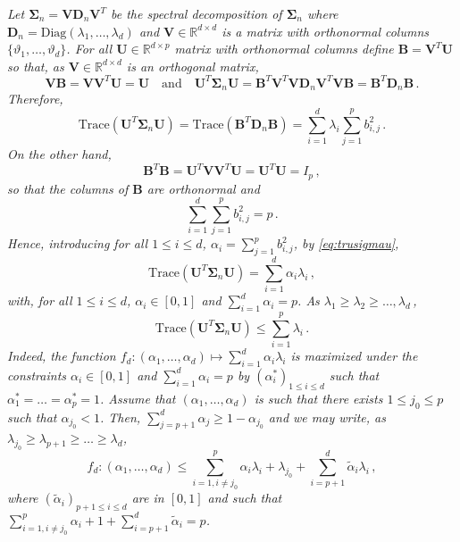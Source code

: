 \documentclass[a4paper,10pt,fleqn]{article}
\newcommand{\eqsp}{\,}
\newcommand{\rset}{\ensuremath{\mathbb{R}}}
\newcommand{\1}{\ensuremath{\mathbbm{1}}}
\newcommand{\bfU}{\mathbf{U}}
\newcommand{\bfs}{\mathbf{\Sigma}}
\newcommand{\bfV}{\mathbf{V}}
\newcommand{\bfB}{\mathbf{B}}
\newcommand{\bfD}{\mathbf{D}}
\begin{document}
\begin{enumerate}
{\em
 Let $\bfs_n = \bfV\bfD_n\bfV^T$ be the spectral decomposition of $\bfs_n$ where $\bfD_n = \mathrm{Diag}(\lambda_1,\ldots,\lambda_d)$ and $\bfV\in\rset^{d\times d}$  is a matrix with orthonormal columns $\{\vartheta_1,\ldots,\vartheta_d\}$. For all  $\bfU\in\rset^{d\times p}$ matrix with orthonormal columns define $\bfB = \bfV^T\bfU$ so that, as $\bfV\in\rset^{d\times d}$ is an orthogonal matrix,
$$
\bfV\bfB = \bfV\bfV^T\bfU = \bfU\quad\mathrm{and}\quad \bfU^T\bfs_n \bfU = \bfB^T\bfV^T\bfV\bfD_n\bfV^T\bfV\bfB = \bfB^T\bfD_n\bfB\eqsp.
$$
Therefore,
\begin{equation}
\label{eq:trusigmau}
\mathrm{Trace}(\bfU^T\bfs_n \bfU) = \mathrm{Trace}(\bfB^T\bfD_n\bfB) = \sum_{i = 1}^d \lambda_i \sum_{j=1}^p b^2_{i,j}\eqsp.
\end{equation}
On the other hand,
$$
\bfB^T\bfB = \bfU^T\bfV\bfV^T\bfU = \bfU^T\bfU = I_p\eqsp,
$$
so that the columns of $\bfB$ are orthonormal and
$$
\sum_{i = 1}^d \sum_{j=1}^p b^2_{i,j} = p\eqsp.
$$
Hence, introducing for all $1\leqslant i \leqslant d$, $\alpha_i =  \sum_{j=1}^p b^2_{i,j}$, by \eqref{eq:trusigmau},
$$
\mathrm{Trace}(\bfU^T\bfs_n \bfU) = \sum_{i=1}^{d}\alpha_i\lambda_i\eqsp,
$$
with, for all $1\leqslant i\leqslant d$, $\alpha_i \in[0,1]$ and $\sum_{i=1}^d\alpha_i  = p$. As $\lambda_1 \geqslant \lambda_2\geqslant \ldots, \lambda_d$\eqsp,
$$
\mathrm{Trace}(\bfU^T\bfs_n \bfU) \leqslant \sum_{i=1}^{p}\lambda_i\eqsp.
$$
Indeed, the function $f_d:(\alpha_1,\ldots,\alpha_d)\mapsto\sum_{i=1}^{d}\alpha_i\lambda_i$ is maximized under the constraints   $\alpha_i \in[0,1]$ and $\sum_{i=1}^d\alpha_i  = p$ by $(\alpha^*_i)_{1\leqslant i \leqslant d}$ such that $\alpha^*_1=\ldots=\alpha^*_p=1$. Assume that $(\alpha_1,\ldots,\alpha_d)$ is such that there exists $1\leqslant j_0\leqslant p$ such that $\alpha_{j_0}<1$. Then, $\sum_{j=p+1}^d\alpha_j \geqslant 1 - \alpha_{j_0}$ and we may write, as $\lambda_{j_0}\geqslant \lambda_{p+1}\geqslant \ldots\geqslant \lambda_d$,
$$
f_d:(\alpha_1,\ldots,\alpha_d) \leqslant \sum_{i=1, i\neq j_0}^{p}\alpha_i\lambda_i + \lambda_{j_0} + \sum_{i=p+1}^{d}\tilde \alpha_i\lambda_i \eqsp,
$$
where $(\tilde \alpha_i)_{p+1\leqslant i\leqslant d}$ are in $[0,1]$ and such that $ \sum_{i=1, i\neq j_0}^{p}\alpha_i + 1 +  \sum_{i=p+1}^{d}\tilde\alpha_i = p$.


}
\end{enumerate}
\end{document}
